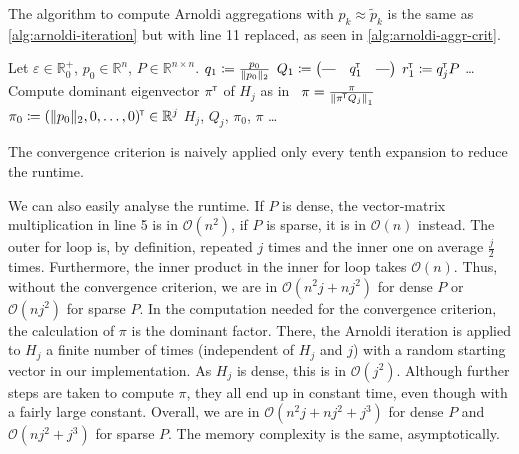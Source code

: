 \documentclass[runningheads]{llncs}
\newcommand*{\bbR}{\mathbb{R}}
\newcommand*{\hpipe}{\rotatebox[origin=c]{90}{$|$}}
\newcommand*{\transp}{^{\mkern-1.5mu{\scriptscriptstyle\mathsf{T}}}}
\DeclarePairedDelimiter{\abs}{\lvert}{\rvert}
\DeclarePairedDelimiter{\norm}{\lVert}{\rVert}
\DeclarePairedDelimiter{\inp}{\langle}{\rangle}
\begin{document}
The algorithm to compute Arnoldi aggregations with $p_k \approx \tilde{p}_k$ is the same as \cref{alg:arnoldi-iteration} but with line 11 replaced, as seen in \cref{alg:arnoldi-aggr-crit}.
\begin{algorithm}[ht]
    \caption{Finding an Arnoldi aggregation with $\inp*{\abs{\pi}, \abs{H_j Q_j - Q_j P} \cdot \mathbf{1}_n} \leq \varepsilon$}\label{alg:arnoldi-aggr-crit}
    \begin{algorithmic}[1]
        \State Let $\varepsilon \in \bbR_0^+$, $p_0 \in \bbR^n$, $P \in \bbR^{n \times n}$.
        \State $q_1 \coloneqq \frac{p_0}{\norm{p_0}_2}$
        \State $Q_1 \coloneqq \begin{pmatrix}\hpipe & q_1\transp & \hpipe\end{pmatrix}$
            \State $r_1\transp \coloneqq q_j\transp P$
            \State \dots {}
                \State Compute dominant eigenvector $\pi\transp$ of $H_j$ as in~\cite{stewart2002krylovschur}
                \State $\pi = \frac{\pi}{\norm*{\pi\transp Q_j}_1}$
                \If{$\pi \in \bbR^j$ and $\inp*{\abs{\pi}, \abs{H_j Q_j - Q_j P} \cdot \mathbf{1}_n} \leq \varepsilon$}
                    \State $\pi_0 \coloneqq (\norm{p_0}_2, 0, \dots, 0)\transp \in \bbR^j$
                    \State \Return $H_j$, $Q_j$, $\pi_0$, $\pi$
                \EndIf
            \EndIf
            \State \dots {}
        \EndFor
    \end{algorithmic}
\end{algorithm}
The convergence criterion is naively applied only every tenth expansion to reduce the runtime.

We can also easily analyse the runtime.
If $P$ is dense, the vector-matrix multiplication in line 5 is in $\mathcal{O}(n^2)$, if $P$ is sparse, it is in $\mathcal{O}(n)$ instead.
The outer for loop is, by definition, repeated $j$ times and the inner one on average $\frac{j}{2}$ times.
Furthermore, the inner product in the inner for loop takes $\mathcal{O}(n)$.
Thus, without the convergence criterion, we are in $\mathcal{O}(n^2j + nj^2)$ for dense $P$ or $\mathcal{O}(nj^2)$ for sparse $P$.
In the computation needed for the convergence criterion, the calculation of $\pi$ is the dominant factor.
There, the Arnoldi iteration is applied to $H_j$ a finite number of times (independent of $H_j$ and $j$) with a random starting vector in our implementation.
As $H_j$ is dense, this is in $\mathcal{O}(j^2)$.
Although further steps are taken to compute $\pi$, they all end up in constant time, even though with a fairly large constant.
Overall, we are in $\mathcal{O}(n^2 j + n j ^2 + j^3)$ for dense $P$ and $\mathcal{O}(n j ^2 + j^3)$ for sparse $P$.
The memory complexity is the same, asymptotically.
\end{document}
